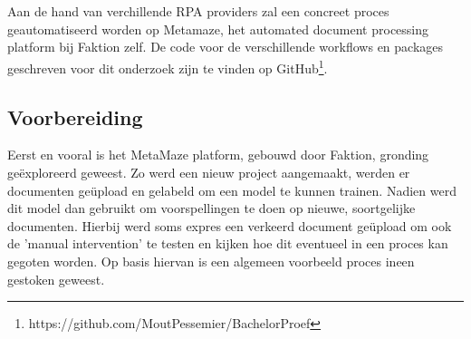 
\chapter{}
\label{ch:methodologie}


Aan de hand van verchillende RPA providers zal een concreet proces geautomatiseerd worden op Metamaze, het automated document processing platform bij Faktion zelf. De code voor de verschillende workflows en packages geschreven voor dit onderzoek zijn te vinden op GitHub\footnote{https://github.com/MoutPessemier/BachelorProef}.


\section{Voorbereiding}


Eerst en vooral is het MetaMaze platform, gebouwd door Faktion, gronding geëxploreerd geweest. Zo werd een nieuw project aangemaakt, werden er documenten geüpload en gelabeld om een model te kunnen trainen. Nadien werd dit model dan gebruikt om voorspellingen te doen op nieuwe, soortgelijke documenten. Hierbij werd soms expres een verkeerd document geüpload om ook de 'manual intervention' te testen en kijken hoe dit eventueel in een proces kan gegoten worden. Op basis hiervan is een algemeen voorbeeld proces ineen gestoken geweest.

